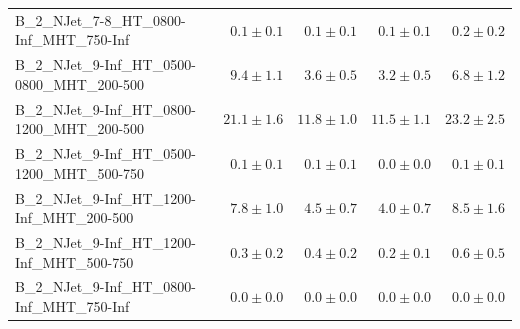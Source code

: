 \documentclass{beamer}
\begin{document}
\begin{frame}
\begin{tabular}{lrrrr}
      B\_2\_NJet\_7-8\_HT\_0800-Inf\_MHT\_750-Inf &               $0.1\pm0.1$&               $0.1\pm0.1$&               $0.1\pm0.1$&                   $0.2\pm0.2$ \\ 
   B\_2\_NJet\_9-Inf\_HT\_0500-0800\_MHT\_200-500 &               $9.4\pm1.1$&               $3.6\pm0.5$&               $3.2\pm0.5$&                   $6.8\pm1.2$ \\ 
   B\_2\_NJet\_9-Inf\_HT\_0800-1200\_MHT\_200-500 &              $21.1\pm1.6$&              $11.8\pm1.0$&              $11.5\pm1.1$&                  $23.2\pm2.5$ \\ 
   B\_2\_NJet\_9-Inf\_HT\_0500-1200\_MHT\_500-750 &               $0.1\pm0.1$&               $0.1\pm0.1$&               $0.0\pm0.0$&                   $0.1\pm0.1$ \\ 
    B\_2\_NJet\_9-Inf\_HT\_1200-Inf\_MHT\_200-500 &               $7.8\pm1.0$&               $4.5\pm0.7$&               $4.0\pm0.7$&                   $8.5\pm1.6$ \\ 
    B\_2\_NJet\_9-Inf\_HT\_1200-Inf\_MHT\_500-750 &               $0.3\pm0.2$&               $0.4\pm0.2$&               $0.2\pm0.1$&                   $0.6\pm0.5$ \\ 
    B\_2\_NJet\_9-Inf\_HT\_0800-Inf\_MHT\_750-Inf &               $0.0\pm0.0$&               $0.0\pm0.0$&               $0.0\pm0.0$&                   $0.0\pm0.0$ \\ 


\bottomrule 
\end{tabular}
\end{frame}
\end{document}
